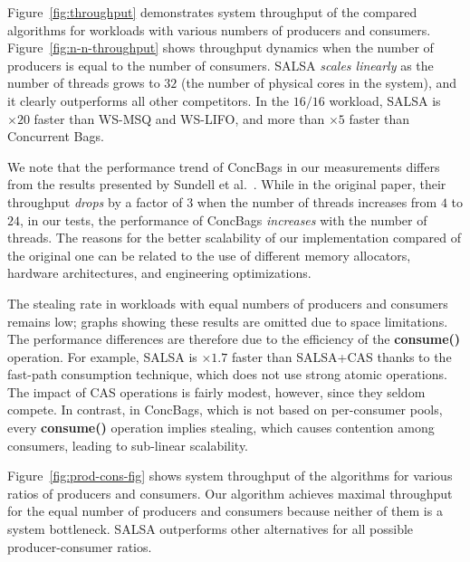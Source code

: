 Figure~\ref{fig:throughput} demonstrates system throughput of the compared algorithms for workloads with various numbers of producers and consumers. 
Figure~\ref{fig:n-n-throughput} shows throughput dynamics when the number of producers is equal to the number of consumers. SALSA \emph{scales linearly} as the number of threads grows to $32$ (the number of physical cores in the system), and it clearly outperforms all other competitors. In the $16/16$ workload, SALSA is $\times20$ faster than WS-MSQ and WS-LIFO, and more than $\times5$ faster than Concurrent Bags. 

We note that the performance trend of ConcBags in our measurements differs from the results presented by Sundell et al.~\cite{Sundell:2011:LAC:1989493.1989550}. 
While in the original paper, their throughput \emph{drops} by a factor of $3$ when the number of threads increases from $4$ to $24$, in our tests, the performance of ConcBags \emph{increases} with the number of threads. The reasons for the better scalability of our implementation compared of the original one can be related to the use of different memory allocators, hardware architectures, and engineering optimizations. %

The stealing rate in workloads with equal numbers of producers and consumers remains low; graphs showing these results are omitted due to space limitations. The performance differences are therefore due to the efficiency of the {\bf consume()} operation. 
For example, SALSA is $\times1.7$ faster than SALSA+CAS thanks to the fast-path consumption technique, which does not use strong atomic operations. The impact of CAS operations is fairly modest, however, since they seldom compete.
In contrast, in ConcBags, which is not based on per-consumer pools, every {\bf consume()} operation implies stealing, which causes contention among consumers, leading to sub-linear scalability.

Figure~\ref{fig:prod-cons-fig} shows system throughput of the algorithms for various ratios of producers and consumers. 
Our algorithm achieves maximal throughput for the equal number of producers and consumers because neither of them is a system bottleneck.
SALSA outperforms other alternatives for all possible producer-consumer ratios. 


